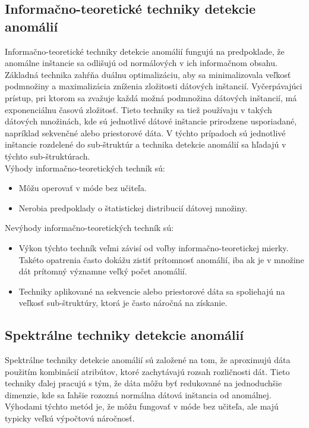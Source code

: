 \subsection{Informačno-teoretické techniky detekcie anomálií}
Informačno-teoretické techniky detekcie anomálií fungujú na predpoklade, že anomálne inštancie sa odlišujú od normálových v ich informačnom obsahu. Základná technika zahŕňa duálnu optimalizáciu, aby sa minimalizovala veľkosť podmnožiny a maximalizácia zníženia zložitosti dátových inštancií. Vyčerpávajúci prístup, pri ktorom sa zvažuje každá možná podmnožina dátových inštancií, má exponenciálnu časovú zložitosť. Tieto techniky sa tiež používaju v takých dátových množinách, kde sú jednotlivé dátové inštancie prirodzene usporiadané, napríklad sekvenčné alebo priestorové dáta. V týchto prípadoch sú jednotlivé inštancie rozdelené do sub-štruktúr a technika detekcie anomálií sa hľadajú v týchto sub-štruktúrach. \\
Výhody informačno-teoretických techník sú:
\begin{itemize}
    \item Môžu operovať v móde bez učiteľa.
    \item Nerobia predpoklady o štatistickej distribucií dátovej množiny.
\end{itemize} 

Nevýhody informačno-teoretických techník sú:
\begin{itemize}
    \item Výkon týchto techník veľmi závisí od voľby informačno-teoretickej mierky. Takéto opatrenia často dokážu zistiť prítomnosť anomálií, iba ak je v množine dát prítomný významne veľký počet anomálií.
    \item Techniky  aplikované na sekvencie alebo priestorové dáta sa spoliehajú na veľkosť sub-štruktúry, ktorá je často náročná na získanie.
\end{itemize} \cite{Chandola}

\subsection{Spektrálne techniky detekcie anomálií}
Spektrálne techniky detekcie anomálií sú založené na tom, že aproximujú dáta použitím kombinácií atribútov, ktoré zachytávajú rozsah rozličnosti dát. Tieto techniky ďalej pracujú s tým, že dáta môžu byť redukované na jednoduchšie dimenzie, kde sa ľahšie rozozná normálna dátová inštancia od anomálnej. Výhodami týchto metód je, že môžu fungovať v móde bez učiteľa, ale majú typicky veľkú výpočtovú náročnosť.\cite{Chandola}

